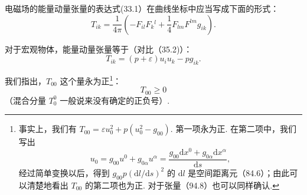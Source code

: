 电磁场的能量动量张量的表达式(33.1）在曲线坐标中应当写成下面的形式：
\begin{equation}
  T_{ik}=\frac{1}{4\pi}\left(-F_{il}F_k{}^l
  +\frac{1}{4}F_{lm}F^{lm}g_{ik}\right).
\end{equation}

对于宏观物体，能量动量张量等于（对比（35.2)）：
\begin{equation}
  T_{ik}=(p+\varepsilon)u_iu_k-pg_{ik}.
\end{equation}

我们指出，$T_{00}$ 这个量永为正\footnote{事实上，我们有 $T_{00}=\varepsilon u_0^2+p(u_0^2-g_{00})$. 第一项永为正. 在第二项中，我们写出
\begin{equation*}
  u_0=g_{00}u^0+g_{0\alpha}u^{\alpha}
  =\frac{g_{00}\mathrm{d}x^0+g_{0\alpha}\mathrm{d}x^{\alpha}}{\mathrm{d}s},
\end{equation*}
经过简单变换以后，得到 $g_{00}p(\mathrm{d}l/\mathrm{d}s)^2$ 的 $\mathrm{d}l$ 是空间距离元（84.6）；由此可以清楚地看出 $T_{00}$ 的第二项也为正. 对于张量（94.8）也可以同样确认.}：
\begin{equation}
  T_{00}\geqslant 0
\end{equation}
（混合分量 $T^0_0$ 一般说来没有确定的正负号）.

